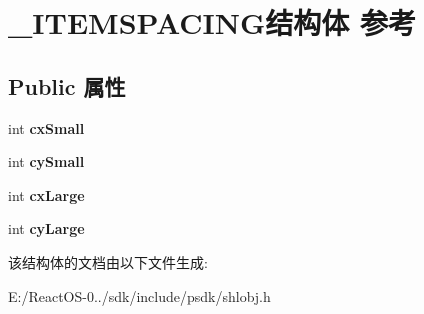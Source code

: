 \hypertarget{struct___i_t_e_m_s_p_a_c_i_n_g}{}\section{\+\_\+\+I\+T\+E\+M\+S\+P\+A\+C\+I\+N\+G结构体 参考}
\label{struct___i_t_e_m_s_p_a_c_i_n_g}
\subsection*{Public 属性}
\begin{DoxyCompactItemize}
\item 
\mbox{\label{struct___i_t_e_m_s_p_a_c_i_n_g_a7e9e0f80ba89db31b1137695f17cbbb0}} 
int {\bfseries cx\+Small}
\item 
\mbox{\label{struct___i_t_e_m_s_p_a_c_i_n_g_a4af1bb8ddb0fb1819e2a9c981ccd1775}} 
int {\bfseries cy\+Small}
\item 
\mbox{\label{struct___i_t_e_m_s_p_a_c_i_n_g_a7720f8f4da9f67c0de2752baace3b86e}} 
int {\bfseries cx\+Large}
\item 
\mbox{\label{struct___i_t_e_m_s_p_a_c_i_n_g_aecaf51a873eb46aae1e115dbdc3f1484}} 
int {\bfseries cy\+Large}
\end{DoxyCompactItemize}


该结构体的文档由以下文件生成\+:\begin{DoxyCompactItemize}
\item 
E\+:/\+React\+O\+S-\/0../sdk/include/psdk/shlobj.\+h\end{DoxyCompactItemize}
